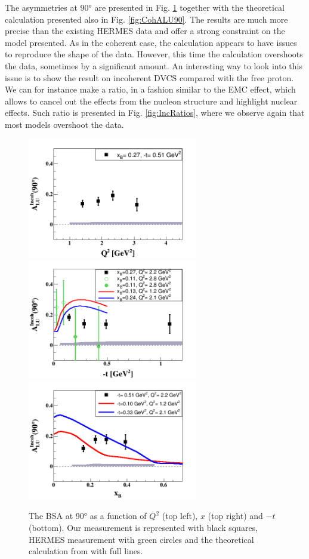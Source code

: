 \documentclass[aps,prc,preprint,superscriptaddress]{revtex4}
\begin{document}
The asymmetries at 90° are presented in Fig. \ref{fig:IncALU} together with the theoretical
calculation presented also in Fig. \ref{fig:CohALU90}. The results are much more precise than 
the existing HERMES data and offer a strong constraint on the model presented. As in the
coherent case, the calculation appears to have issues to reproduce the shape of the data.
However, this time the calculation overshoots the data, sometimes by a significant amount.
An interesting way to look into this issue is to show the result on incoherent DVCS compared 
with the free proton. We can for instance make a ratio, in a fashion similar to the EMC 
effect, which allows to cancel out
the effects from the nucleon structure and highlight nuclear effects. Such ratio is presented
in Fig. \ref{fig:IncRatios}, where we observe again that most models overshoot the data.


\begin{figure}[tbp!]
\center
\includegraphics[width=7.4cm]{fig3/ALU_90_p_vs_Q2_shortscenrario.png}
\includegraphics[width=7.4cm]{fig3/ALU_90_p_vs_t_shortscenrario.png}
\includegraphics[width=7.4cm]{fig3/ALU_90_p_vs_x_shortscenrario.png}
	\caption{The BSA at 90° as a function of  $Q^2$ (top left), $x$ (top right) and 
	$-t$ (bottom). Our measurement is represented with black squares, HERMES 
	measurement \cite{Airapetian:2009cga} with green circles and the theoretical 
	calculation from \cite{Liuti:2005gi} with full lines.}
\label{fig:IncALU}
\end{figure}
\end{document}
